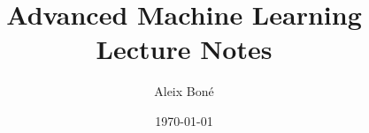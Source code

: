 
\renewcommand\and{\\[\baselineskip]}

\title{\Huge Advanced Machine Learning\\ \Large Lecture Notes}
\author{Aleix Boné}
\date{\today}








\tableofcontents \pagebreak

\listoffigures \listoftables \clearpage



\setlength{\parskip}{1em plus 0.5em minus 0.2em}





\nocite{*}

\printbibliography


